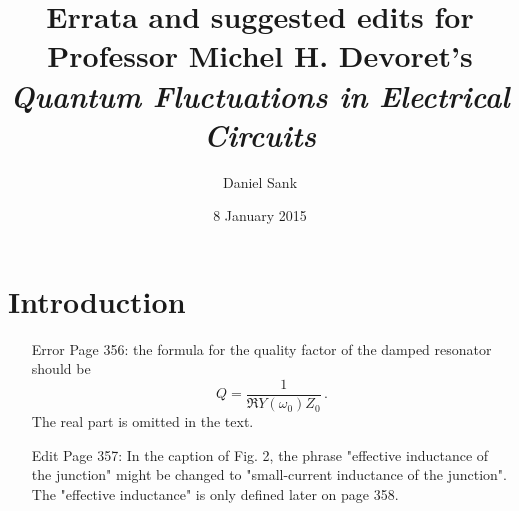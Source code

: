 \documentclass{article}
\title{Errata and suggested edits for \\
Professor Michel H. Devoret's\\
\textit{Quantum Fluctuations in Electrical Circuits}}
\author{Daniel Sank}
\date{8 January 2015}
\begin{document}
\maketitle

\section{Introduction}

\begin{itemize}

\item[Error] Page 356: the formula for the quality factor of the damped resonator should be
\begin{equation}
Q = \frac{1}{\Re{Y(\omega_0)} Z_0} \nonumber \, .
\end{equation} 
The real part is omitted in the text.

\item[Edit] Page 357: In the caption of Fig. 2, the phrase "effective inductance of the junction" might be changed to "small-current inductance of the junction". The "effective inductance" is only defined later on page 358.

\end{itemize}







\end{document}
